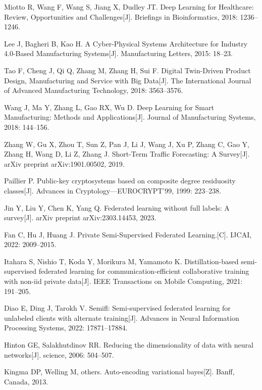\begin{thebibliography}{200}
	Miotto R, Wang F, Wang S, Jiang X, Dudley JT. Deep Learning for Healthcare: Review, Opportunities and Challenges[J]. Briefings in Bioinformatics, 2018: 1236--1246.
	
	Lee J, Bagheri B, Kao H. A Cyber-Physical Systems Architecture for Industry 4.0-Based Manufacturing Systems[J]. Manufacturing Letters, 2015: 18--23.
	
	Tao F, Cheng J, Qi Q, Zhang M, Zhang H, Sui F. Digital Twin-Driven Product Design, Manufacturing and Service with Big Data[J]. The International Journal of Advanced Manufacturing Technology, 2018: 3563--3576.
	
	Wang J, Ma Y, Zhang L, Gao RX, Wu D. Deep Learning for Smart Manufacturing: Methods and Applications[J]. Journal of Manufacturing Systems, 2018: 144--156.
	
	Zhang W, Gu X, Zhou T, Sun Z, Pan J, Li J, Wang J, Xu P, Zhang C, Gao Y, Zhang H, Wang D, Li Z, Zhang J. Short-Term Traffic Forecasting: A Survey[J]. arXiv preprint arXiv:1901.00502, 2019.
	
	Paillier P. Public-key cryptosystems based on composite degree residuosity classes[J]. Advances in Cryptology—EUROCRYPT'99, 1999: 223--238.
	
	Jin Y, Liu Y, Chen K, Yang Q. Federated learning without full labels: A survey[J]. arXiv preprint arXiv:2303.14453, 2023.
	
	Fan C, Hu J, Huang J. Private Semi-Supervised Federated Learning.[C]. IJCAI, 2022: 2009--2015.
	
	Itahara S, Nishio T, Koda Y, Morikura M, Yamamoto K. Distillation-based semi-supervised federated learning for communication-efficient collaborative training with non-iid private data[J]. IEEE Transactions on Mobile Computing, 2021: 191--205.
	
	Diao E, Ding J, Tarokh V. Semifl: Semi-supervised federated learning for unlabeled clients with alternate training[J]. Advances in Neural Information Processing Systems, 2022: 17871--17884.
	
	Hinton GE, Salakhutdinov RR. Reducing the dimensionality of data with neural networks[J]. science, 2006: 504--507.
	
	Kingma DP, Welling M, others. Auto-encoding variational bayes[Z]. Banff, Canada, 2013.
	

\end{thebibliography}
